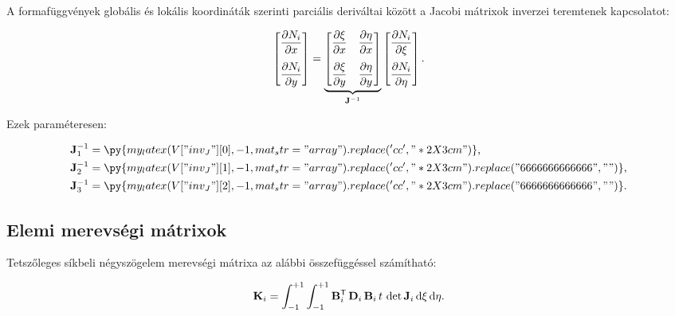 A formafüggvények globális és lokális koordináták szerinti parciális deriváltai
között a Jacobi mátrixok inverzei teremtenek kapcsolatot:
\begin{myframe}
  \begin{equation}
    \begin{bmatrix}
      \displaystyle \pdv{N_i}{x} \\[4mm]
      \displaystyle \pdv{N_i}{y} \\
    \end{bmatrix}
    =
    \underbrace{
      \begin{bmatrix}
        \displaystyle \pdv{\xi}{x} &
        \displaystyle \pdv{\eta}{x}  \\[4mm]
        \displaystyle \pdv{\xi}{y} &
        \displaystyle \pdv{\eta}{y}  \\
      \end{bmatrix}
    }_{\mathbf{J}^{-1}}
    \begin{bmatrix}
      \displaystyle \pdv{N_i}{\xi}  \\[4mm]
      \displaystyle \pdv{N_i}{\eta} \\
    \end{bmatrix}
    \text.
  \end{equation}
\end{myframe}
Ezek paraméteresen:
\begin{myframe}
  \def\arraystretch{2.25}
  \begin{align}
    \rmat J_1^{-1} & =
    \py{my_latex(V["inv_J"][0], -1, mat_str="array").replace('cc', "*{2}{X{3cm}}")}
    \text,
    \\
    \rmat J_2^{-1} & =
    \py{my_latex(V["inv_J"][1], -1, mat_str="array").replace('cc', "*{2}{X{3cm}}").replace("6666666666666", "")}
    \text,
    \\
    \rmat J_3^{-1} & =
    \py{my_latex(V["inv_J"][2], -1, mat_str="array").replace('cc', "*{2}{X{3cm}}").replace("6666666666666", "")}
    \text.
  \end{align}
\end{myframe}

\subsection{Elemi merevségi mátrixok}

Tetszőleges síkbeli négyszögelem merevségi mátrixa az alábbi összefüggéssel
számítható:
\begin{myframe}
  \begin{equation}
    \mathbf{K}_i
    = \int_{-1}^{+1} \int_{-1}^{+1}
    \mathbf{B}^{\mathsf T}_i \,
    \mathbf{D}_i \,
    \mathbf{B}_i \,
    t \,
    \det \mathbf{J}_i \,
    \mathrm d \xi \,
    \mathrm d \eta
    \text.
  \end{equation}
\end{myframe}

